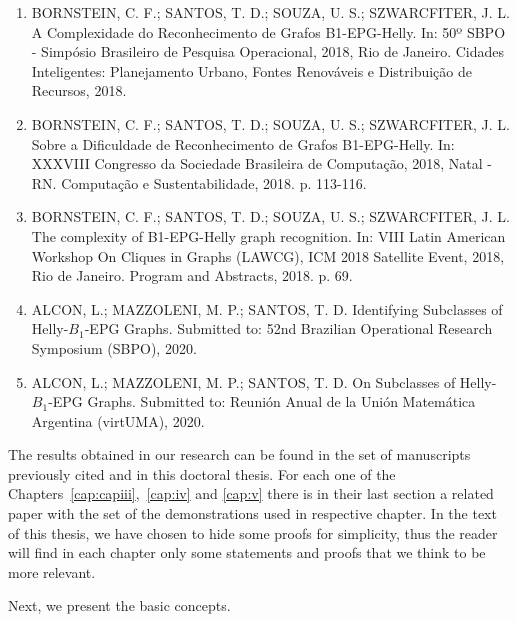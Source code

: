 \begin{enumerate}
    \item BORNSTEIN, C. F.; SANTOS, T. D.; SOUZA, U. S.; SZWARCFITER, J. L. A Complexidade do Reconhecimento de Grafos B1-EPG-Helly. In: 50º SBPO - Simpósio Brasileiro de Pesquisa Operacional, 2018, Rio de Janeiro. Cidades Inteligentes: Planejamento Urbano, Fontes Renováveis e Distribuição de Recursos, 2018.

     \item BORNSTEIN, C. F.; SANTOS, T. D.; SOUZA, U. S.; SZWARCFITER, J. L. Sobre a Dificuldade de Reconhecimento de Grafos B1-EPG-Helly. In: XXXVIII Congresso da Sociedade Brasileira de Computação, 2018, Natal - RN. Computação e Sustentabilidade, 2018. p. 113-116.

     
     \item BORNSTEIN, C. F.; SANTOS, T. D.; SOUZA, U. S.; SZWARCFITER, J. L. The complexity of B1-EPG-Helly graph recognition. In: VIII Latin American Workshop On Cliques in Graphs (LAWCG), ICM 2018 Satellite Event, 2018, Rio de Janeiro. Program and Abstracts, 2018. p. 69.
    
    \item ALCON, L.; MAZZOLENI, M. P.;  SANTOS, T. D. Identifying Subclasses of Helly-$B_1$-EPG Graphs. Submitted to: 52nd  Brazilian Operational Research Symposium (SBPO), 2020.
     
    \item ALCON, L.; MAZZOLENI, M. P.;  SANTOS, T. D. On Subclasses of Helly-$B_1$-EPG Graphs. Submitted to: 
    Reunión Anual de la Unión Matemática Argentina (virtUMA), 2020.
    
\end{enumerate}



The results obtained in our research can be found in the set of manuscripts previously cited and in this doctoral thesis. For each one of the
Chapters~\ref{cap:capiii},~\ref{cap:iv} and \ref{cap:v} there is in their last section a related paper with the set of the demonstrations used in respective chapter. In the
text of this thesis, we have chosen to hide some proofs for simplicity, thus the reader will find in each chapter only  some statements and proofs that we think to be more relevant. %

Next, we present the basic concepts. %